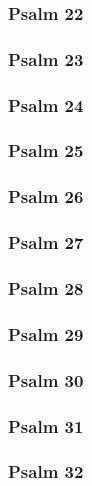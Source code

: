 \documentclass[10pt]{extarticle}
\begin{document}
\begin{multicols}{2}
\subsubsection{Psalm 22}

\newpage

\subsubsection{Psalm 23}

\newpage

\subsubsection{Psalm 24}

\newpage

\subsubsection{Psalm 25}

\newpage

\subsubsection{Psalm 26}

\newpage

\subsubsection{Psalm 27}

\newpage

\subsubsection{Psalm 28}

\newpage

\subsubsection{Psalm 29}

\newpage

\subsubsection{Psalm 30}

\newpage

\subsubsection{Psalm 31}

\newpage

\subsubsection{Psalm 32}

\newpage


\end{multicols}
\end{document}
